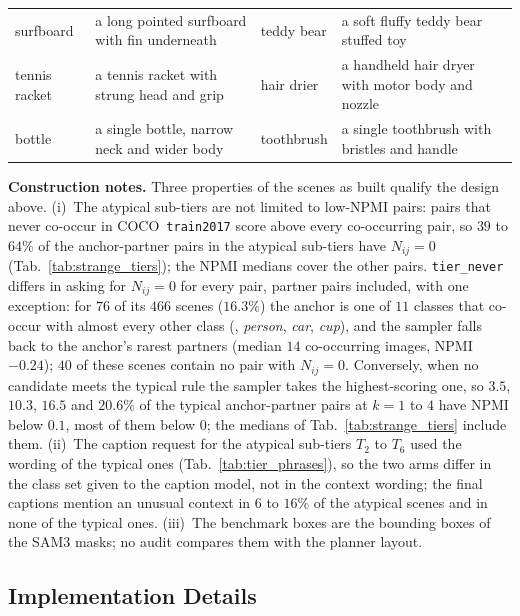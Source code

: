 \begin{table}[p]
{\begin{tabular}{@{}p{}p{}p{}p{}@{}}
surfboard      & a long pointed surfboard with fin underneath              & teddy bear     & a soft fluffy teddy bear stuffed toy \\
tennis racket  & a tennis racket with strung head and grip                 & hair drier     & a handheld hair dryer with motor body and nozzle \\
bottle         & a single bottle, narrow neck and wider body               & toothbrush     & a single toothbrush with bristles and handle \\
\bottomrule
\end{tabular}
}
\end{table}

\noindent\textbf{Construction notes.} Three properties of the scenes as built qualify the design above. (i)~The atypical sub-tiers are not limited to low-NPMI pairs: pairs that never co-occur in COCO~\texttt{train2017} score above every co-occurring pair, so $39$ to $64\%$ of the anchor-partner pairs in the atypical sub-tiers have $N_{ij}{=}0$ (Tab.~\ref{tab:strange_tiers}); the NPMI medians cover the other pairs. \texttt{tier\_never} differs in asking for $N_{ij}{=}0$ for every pair, partner pairs included, with one exception: for $76$ of its $466$ scenes ($16.3\%$) the anchor is one of $11$ classes that co-occur with almost every other class (\eg, \emph{person}, \emph{car}, \emph{cup}), and the sampler falls back to the anchor's rarest partners (median $14$ co-occurring images, NPMI $-0.24$); $40$ of these scenes contain no pair with $N_{ij}{=}0$. Conversely, when no candidate meets the typical rule the sampler takes the highest-scoring one, so $3.5$, $10.3$, $16.5$ and $20.6\%$ of the typical anchor-partner pairs at $k = 1$ to $4$ have NPMI below $0.1$, most of them below $0$; the medians of Tab.~\ref{tab:strange_tiers} include them. (ii)~The caption request for the atypical sub-tiers $T_2$ to $T_6$ used the wording of the typical ones (Tab.~\ref{tab:tier_phrases}), so the two arms differ in the class set given to the caption model, not in the context wording; the final captions mention an unusual context in $6$ to $16\%$ of the atypical scenes and in none of the typical ones. (iii)~The benchmark boxes are the bounding boxes of the SAM3 masks; no audit compares them with the planner layout.

\FloatBarrier
\subsection{Implementation Details}
\label{app:strange:impl}

